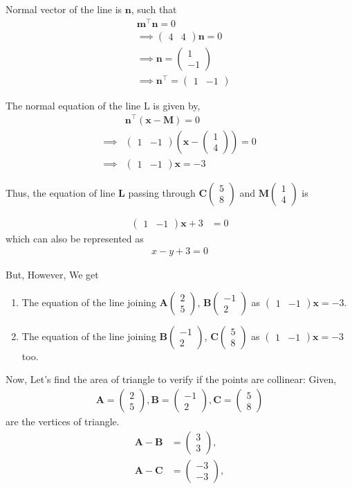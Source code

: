 \documentclass[journal,12pt,twocolumn]{IEEEtran}
\let\vec\mathbf
\newcommand{\myvec}[1]{\ensuremath{\begin{pmatrix}#1\end{pmatrix}}}
\providecommand{\brak}[1]{\ensuremath{\left(#1\right)}}
\begin{document}
    Normal vector of the line is $\vec{n}$, such that
    \begin{align}
	    &\vec{m}^{\top}\vec{n} = 0\\
	    &\implies \myvec{4 & 4}\vec{n} = 0\\
	    &\implies \vec{n} = \myvec{1 \\ -1}\\
	    &\implies \vec{n}^{\top} = \myvec{1 & -1}
    \end{align}
    
    The normal equation of the line L is given by, 
    \begin{align}
	    &\vec{n}^{\top}\brak{\vec{x} - \vec{M}} = 0\\
	    \implies &\myvec{1 & -1}\brak{\vec{x} - \myvec{1 \\ 4}}= 0\\
	    \implies &\myvec{1 & -1}\vec{x} = -3
    \end{align}
    
    Thus, the equation of line $\vec{L}$ passing through  $\vec{C}\myvec{5\\8}$ and $\vec{M}\myvec{1\\4}$ is 
        
    \begin{align}
          \myvec{1 & - 1}\vec{x} + 3 &= 0
    \end{align}
        which can also be represented as 
    \begin{align}
         x-y+3=0
    \end{align}
      
    {\large But, However,} We get
    \begin{enumerate}
        \item The equation of the line joining $\vec{A}\myvec{2\\5}$, $\vec{B}\myvec{-1\\2}$ as $\myvec{1 & - 1}\vec{x} = -3$.
           
        \item The equation of the line joining $\vec{B}\myvec{-1\\2}$, $\vec{C}\myvec{5\\8}$ as $\myvec{1 & - 1}\vec{x}=-3$ too.
    \end{enumerate}
   
    Now, Let's find the area of triangle to verify if the points are collinear:
    Given, 
    \begin{align}
		\vec{A} = \myvec{2 \\ 5} ,
		\vec{B} = \myvec{-1 \\ 2},
		\vec{C} = \myvec{5 \\ 8}
	\end{align}
	are the vertices of triangle.
	\begin{align}
	\vec{A}-\vec{B} &= \myvec{3 \\3},\\
	\vec{A}-\vec{C} &= \myvec{-3 \\-3},
	\end{align}
	
\end{document}
